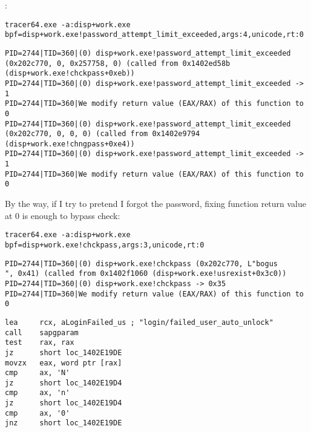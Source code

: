 :

\begin{lstlisting}
tracer64.exe -a:disp+work.exe bpf=disp+work.exe!password_attempt_limit_exceeded,args:4,unicode,rt:0
\end{lstlisting}

\begin{lstlisting}
PID=2744|TID=360|(0) disp+work.exe!password_attempt_limit_exceeded (0x202c770, 0, 0x257758, 0) (called from 0x1402ed58b (disp+work.exe!chckpass+0xeb))
PID=2744|TID=360|(0) disp+work.exe!password_attempt_limit_exceeded -> 1
PID=2744|TID=360|We modify return value (EAX/RAX) of this function to 0
PID=2744|TID=360|(0) disp+work.exe!password_attempt_limit_exceeded (0x202c770, 0, 0, 0) (called from 0x1402e9794 (disp+work.exe!chngpass+0xe4))
PID=2744|TID=360|(0) disp+work.exe!password_attempt_limit_exceeded -> 1
PID=2744|TID=360|We modify return value (EAX/RAX) of this function to 0
\end{lstlisting}


{By the way, if I try to pretend I forgot the password, fixing  function return value at $0$ is enough to bypass check:}

\begin{lstlisting}
tracer64.exe -a:disp+work.exe bpf=disp+work.exe!chckpass,args:3,unicode,rt:0
\end{lstlisting}

\begin{lstlisting}
PID=2744|TID=360|(0) disp+work.exe!chckpass (0x202c770, L"bogus                                   ", 0x41) (called from 0x1402f1060 (disp+work.exe!usrexist+0x3c0))
PID=2744|TID=360|(0) disp+work.exe!chckpass -> 0x35
PID=2744|TID=360|We modify return value (EAX/RAX) of this function to 0
\end{lstlisting}


\begin{lstlisting}
lea     rcx, aLoginFailed_us ; "login/failed_user_auto_unlock"
call    sapgparam
test    rax, rax
jz      short loc_1402E19DE
movzx   eax, word ptr [rax]
cmp     ax, 'N'
jz      short loc_1402E19D4
cmp     ax, 'n'
jz      short loc_1402E19D4
cmp     ax, '0'
jnz     short loc_1402E19DE
\end{lstlisting}

